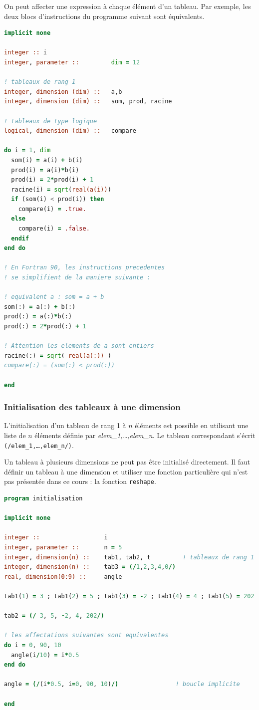 \documentclass[a4paper,twoside]{article}
\begin{document}
On peut affecter une expression à chaque élément d'un tableau. Par exemple, les deux blocs d'instructions du programme suivant sont équivalents.

\begin{lstlisting}[language=Fortran]
implicit none 
  
integer :: i
integer, parameter ::         dim = 12

! tableaux de rang 1
integer, dimension (dim) ::   a,b
integer, dimension (dim) ::   som, prod, racine

! tableaux de type logique
logical, dimension (dim) ::   compare

do i = 1, dim 
  som(i) = a(i) + b(i) 
  prod(i) = a(i)*b(i)
  prod(i) = 2*prod(i) + 1 
  racine(i) = sqrt(real(a(i))) 
  if (som(i) < prod(i)) then 
    compare(i) = .true. 
  else 
    compare(i) = .false. 
  endif 
end do 

! En Fortran 90, les instructions precedentes
! se simplifient de la maniere suivante : 
    
! equivalent a : som = a + b
som(:) = a(:) + b(:)
prod(:) = a(:)*b(:)
prod(:) = 2*prod(:) + 1 

! Attention les elements de a sont entiers 
racine(:) = sqrt( real(a(:)) )
compare(:) = (som(:) < prod(:)) 

end
\end{lstlisting}

\subsubsection{Initialisation des tableaux à une dimension}\label{sec:initialisation_tableau}

L'initialisation d'un tableau de rang 1 à $n$ éléments est possible en utilisant une liste de $n$ éléments définie par \emph{elem\_1,\ldots,elem\_n}. Le tableau correspondant s'écrit \texttt{(/elem\_1,\ldots,elem\_n/)}. 

Un tableau à plusieurs dimensions ne peut pas être initialisé directement. Il faut définir un tableau à une dimension et utiliser une fonction particulière qui n'est pas présentée dans ce cours : la fonction \texttt{reshape}.
 
\begin{lstlisting}[language=Fortran]
program initialisation

implicit none

integer ::                  i
integer, parameter ::       n = 5
integer, dimension(n) ::    tab1, tab2, t         ! tableaux de rang 1
integer, dimension(n) ::    tab3 = (/1,2,3,4,0/)
real, dimension(0:9) ::     angle

tab1(1) = 3 ; tab1(2) = 5 ; tab1(3) = -2 ; tab1(4) = 4 ; tab1(5) = 202

tab2 = (/ 3, 5, -2, 4, 202/)

! les affectations suivantes sont equivalentes
do i = 0, 90, 10
  angle(i/10) = i*0.5
end do

angle = (/(i*0.5, i=0, 90, 10)/)                ! boucle implicite

end
\end{lstlisting}
\end{document}
